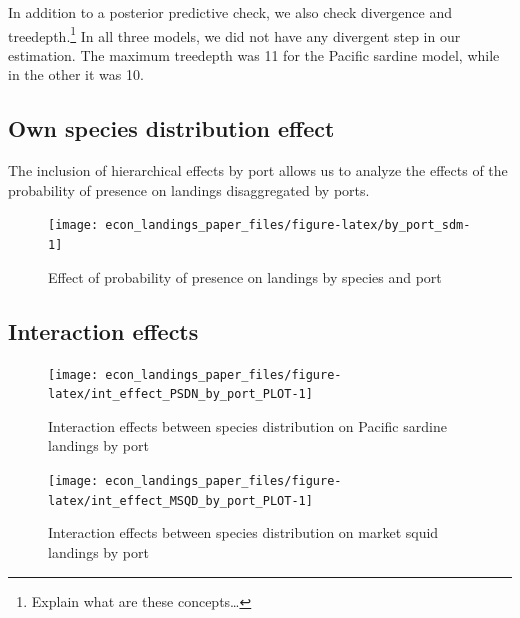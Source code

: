 In addition to a posterior predictive check, we also check divergence
and treedepth.\footnote{Explain what are these concepts\ldots{}} In all
three models, we did not have any divergent step in our estimation. The
maximum treedepth was 11 for the Pacific sardine model, while in the
other it was 10.

\hypertarget{own-species-distribution-effect}{%
\subsection{Own species distribution
effect}\label{own-species-distribution-effect}}

The inclusion of hierarchical effects by port allows us to analyze the
effects of the probability of presence on landings disaggregated by
ports.

\begin{Schunk}
\begin{figure}
\texttt{[image: econ\_landings\_paper\_files/figure-latex/by\_port\_sdm-1]} \caption{Effect of probability of presence on landings by species and port\label{fig:sdmeffects}}\label{fig:by_port_sdm}
\end{figure}
\end{Schunk}

\hypertarget{interaction-effects}{%
\subsection{Interaction effects}\label{interaction-effects}}

\begin{Schunk}
\begin{figure}
\texttt{[image: econ\_landings\_paper\_files/figure-latex/int\_effect\_PSDN\_by\_port\_PLOT-1]} \caption{Interaction effects between species distribution on Pacific sardine landings by port\label{fig:sdm_int_psdn}}\label{fig:int_effect_PSDN_by_port_PLOT}
\end{figure}
\end{Schunk}

\begin{Schunk}
\begin{figure}
\texttt{[image: econ\_landings\_paper\_files/figure-latex/int\_effect\_MSQD\_by\_port\_PLOT-1]} \caption{Interaction effects between species distribution on market squid landings by port\label{fig:sdm_int_msqd}}\label{fig:int_effect_MSQD_by_port_PLOT}
\end{figure}
\end{Schunk}

